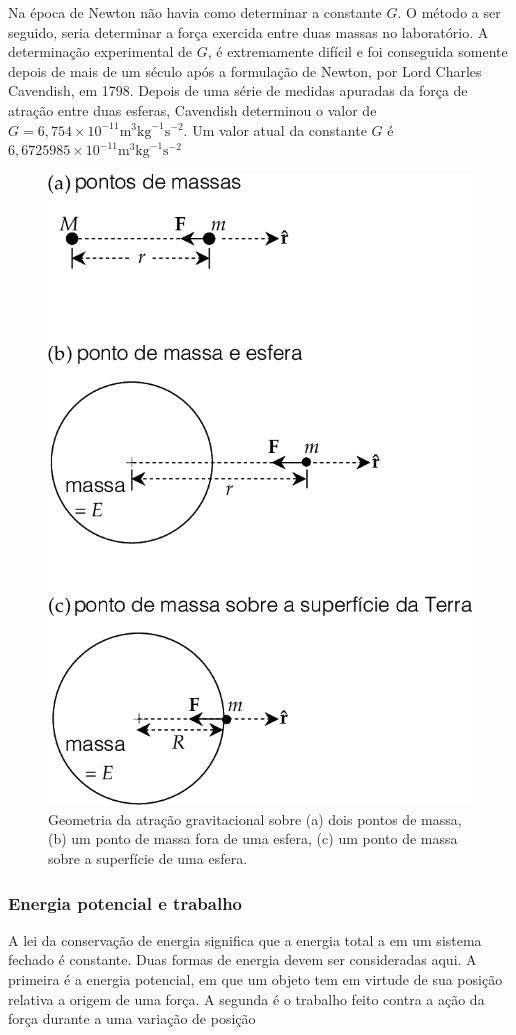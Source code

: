 \documentclass[]{book}
\theoremstyle{definition}
\theoremstyle{definition}
\theoremstyle{definition}
\theoremstyle{remark}
\begin{document}
Na época de Newton não havia como determinar a constante \(G\). O método a ser seguido, seria determinar a força exercida entre duas massas no laboratório. A determinação experimental de \(G\), é extremamente difícil e foi conseguida somente depois de mais de um século após a formulação de Newton, por Lord Charles Cavendish, em 1798. Depois de uma série de medidas apuradas da força de atração entre duas esferas, Cavendish determinou o valor de \(G = 6,754 \times 10^{-11} \mathrm{m}^3 \mathrm{kg}^{-1}\mathrm{s}^{-2}\). Um valor atual da constante \(G\) é \(6,6725985 \times 10^{-11} \mathrm{m}^3 \mathrm{kg}^{-1}\mathrm{s}^{-2}\)

\begin{figure}

{\centering \includegraphics[width=0.4\linewidth]{fig/Fig_02.04} 

}

\caption{Geometria da atração gravitacional sobre (a) dois pontos de massa, (b) um ponto de massa fora de uma esfera, (c) um ponto de massa sobre a superfície de uma esfera.}\label{fig:atracao}
\end{figure}

\hypertarget{energia-potencial-e-trabalho}{%
\subsubsection{Energia potencial e trabalho}\label{energia-potencial-e-trabalho}}

A lei da conservação de energia significa que a energia total a em um sistema fechado é constante. Duas formas de energia devem ser consideradas aqui. A primeira é a energia potencial, em que um objeto tem em virtude de sua posição relativa a origem de uma força. A segunda é o trabalho feito contra a ação da força durante a uma variação de posição
\end{document}
